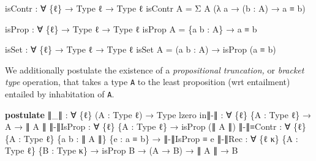 \documentclass[
  11pt,
  oneside,
  article]{memoir}
\newenvironment{Shaded}{}{}
\newcommand{\KeywordTok}[1]{\textcolor[rgb]{0.00,0.44,0.13}{\textbf{#1}}}
\newcommand{\NormalTok}[1]{#1}
\newcommand{\OtherTok}[1]{\textcolor[rgb]{0.00,0.44,0.13}{#1}}
\theoremstyle{definition}
\theoremstyle{plain}
\newcommand{\0}{\textsf{0}}
\newcommand{\1}{\tn{\textsf{1}}}
\begin{document}
\begin{Shaded}
\begin{Highlighting}[]
\NormalTok{isContr }\OtherTok{:} \OtherTok{∀} \OtherTok{\{}\NormalTok{ℓ}\OtherTok{\}} \OtherTok{→}\NormalTok{ Type ℓ }\OtherTok{→}\NormalTok{ Type ℓ}
\NormalTok{isContr A }\OtherTok{=}\NormalTok{ Σ A }\OtherTok{(λ}\NormalTok{ a }\OtherTok{→} \OtherTok{(}\NormalTok{b }\OtherTok{:}\NormalTok{ A}\OtherTok{)} \OtherTok{→}\NormalTok{ a ≡ b}\OtherTok{)}

\NormalTok{isProp }\OtherTok{:} \OtherTok{∀} \OtherTok{\{}\NormalTok{ℓ}\OtherTok{\}} \OtherTok{→}\NormalTok{ Type ℓ }\OtherTok{→}\NormalTok{ Type ℓ}
\NormalTok{isProp A }\OtherTok{=} \OtherTok{\{}\NormalTok{a b }\OtherTok{:}\NormalTok{ A}\OtherTok{\}} \OtherTok{→}\NormalTok{ a ≡ b}

\NormalTok{isSet }\OtherTok{:} \OtherTok{∀} \OtherTok{\{}\NormalTok{ℓ}\OtherTok{\}} \OtherTok{→}\NormalTok{ Type ℓ }\OtherTok{→}\NormalTok{ Type ℓ}
\NormalTok{isSet A }\OtherTok{=} \OtherTok{(}\NormalTok{a b }\OtherTok{:}\NormalTok{ A}\OtherTok{)} \OtherTok{→}\NormalTok{ isProp }\OtherTok{(}\NormalTok{a ≡ b}\OtherTok{)}
\end{Highlighting}
\end{Shaded}

We additionally postulate the existence of a \emph{propositional
truncation,} or \emph{bracket type} operation, that takes a type
\texttt{A} to the least proposition (wrt entailment) entailed by
inhabitation of \texttt{A}.

\begin{Shaded}
\begin{Highlighting}[]
\KeywordTok{postulate}
\NormalTok{    ∥}\OtherTok{\_}\NormalTok{∥ }\OtherTok{:} \OtherTok{∀} \OtherTok{\{}\NormalTok{ℓ}\OtherTok{\}} \OtherTok{(}\NormalTok{A }\OtherTok{:}\NormalTok{ Type ℓ}\OtherTok{)} \OtherTok{→}\NormalTok{ Type lzero}
\NormalTok{    in∥{-}∥ }\OtherTok{:} \OtherTok{∀} \OtherTok{\{}\NormalTok{ℓ}\OtherTok{\}} \OtherTok{\{}\NormalTok{A }\OtherTok{:}\NormalTok{ Type ℓ}\OtherTok{\}} \OtherTok{→}\NormalTok{ A }\OtherTok{→}\NormalTok{ ∥ A ∥}
\NormalTok{    ∥{-}∥IsProp }\OtherTok{:} \OtherTok{∀} \OtherTok{\{}\NormalTok{ℓ}\OtherTok{\}} \OtherTok{\{}\NormalTok{A }\OtherTok{:}\NormalTok{ Type ℓ}\OtherTok{\}} \OtherTok{→}\NormalTok{ isProp }\OtherTok{(}\NormalTok{∥ A ∥}\OtherTok{)}
\NormalTok{    ∥{-}∥≡Contr }\OtherTok{:} \OtherTok{∀} \OtherTok{\{}\NormalTok{ℓ}\OtherTok{\}} \OtherTok{\{}\NormalTok{A }\OtherTok{:}\NormalTok{ Type ℓ}\OtherTok{\}} \OtherTok{\{}\NormalTok{a b }\OtherTok{:}\NormalTok{ ∥ A ∥}\OtherTok{\}} \OtherTok{\{}\NormalTok{e }\OtherTok{:}\NormalTok{ a ≡ b}\OtherTok{\}} \OtherTok{→}\NormalTok{ ∥{-}∥IsProp ≡ e}
\NormalTok{    ∥{-}∥Rec }\OtherTok{:} \OtherTok{∀} \OtherTok{\{}\NormalTok{ℓ κ}\OtherTok{\}} \OtherTok{\{}\NormalTok{A }\OtherTok{:}\NormalTok{ Type ℓ}\OtherTok{\}} \OtherTok{\{}\NormalTok{B }\OtherTok{:}\NormalTok{ Type κ}\OtherTok{\}}
            \OtherTok{→}\NormalTok{ isProp B }\OtherTok{→} \OtherTok{(}\NormalTok{A }\OtherTok{→}\NormalTok{ B}\OtherTok{)} \OtherTok{→}\NormalTok{ ∥ A ∥ }\OtherTok{→}\NormalTok{ B}
\end{Highlighting}
\end{Shaded}
\end{document}
